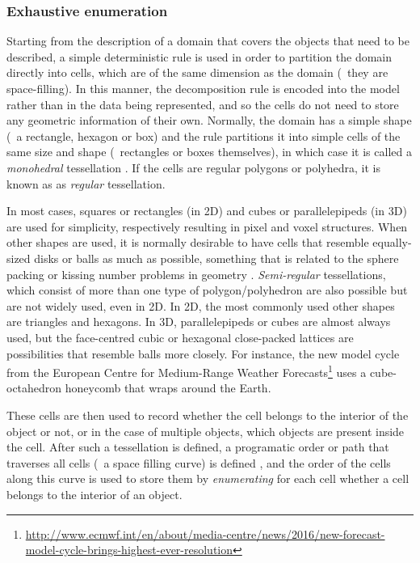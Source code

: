 \subsubsection{Exhaustive enumeration}

Starting from the description of a domain that covers the objects that need to be described, a simple deterministic rule is used in order to partition the domain directly into cells, which are of the same dimension as the domain (\ie\ they are space-filling).
In this manner, the decomposition rule is encoded into the model rather than in the data being represented, and so the cells do not need to store any geometric information of their own.
Normally, the domain has a simple shape (\eg\ a rectangle, hexagon or box) \citep[\S{}6.8]{ISO19123:2007} and the rule partitions it into simple cells of the same size and shape (\eg\ rectangles or boxes themselves), in which case it is called a \emph{monohedral} tessellation \citep{Boots99}.
If the cells are regular polygons or polyhedra, it is known as as \emph{regular} tessellation.

In most cases, squares or rectangles (in 2D) and cubes or parallelepipeds (in 3D) are used for simplicity, respectively resulting in pixel and voxel structures.
When other shapes are used, it is normally desirable to have cells that resemble equally-sized disks or balls as much as possible, something that is related to the sphere packing or kissing number problems in geometry \citep{Conway92}.
\emph{Semi-regular} tessellations, which consist of more than one type of polygon/polyhedron are also possible but are not widely used, even in 2D.
In 2D, the most commonly used other shapes are triangles and hexagons.
In 3D, parallelepipeds or cubes are almost always used, but the face-centred cubic or hexagonal close-packed lattices are possibilities that resemble balls more closely.
For instance, the new model cycle from the European Centre for Medium-Range Weather Forecasts\footnote{\url{http://www.ecmwf.int/en/about/media-centre/news/2016/new-forecast-model-cycle-brings-highest-ever-resolution}} uses a cube-octahedron honeycomb that wraps around the Earth.

These cells are then used to record whether the cell belongs to the interior of the object or not, or in the case of multiple objects, which objects are present inside the cell.
After such a tessellation is defined, a programatic order or path that traverses all cells (\ie\ a space filling curve) is defined \citep{Sagan94}, and the order of the cells along this curve is used to store them by \emph{enumerating} for each cell whether a cell belongs to the interior of an object.

